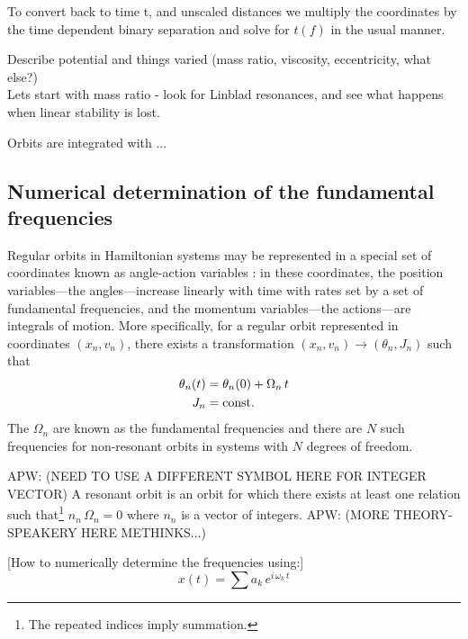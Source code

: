 \documentclass[usenatbib]{mn2e}
\newcommand{\apwtodo}[1]{{\color{red} APW: (\MakeUppercase{#1})}}
\begin{document}

To convert back to time t, and unscaled distances we multiply the
coordinates by the time dependent binary separation and solve for
$t(f)$ in the usual manner.



Describe potential and things varied (mass ratio, viscosity,
eccentricity, what else?)\\ Lets start with mass ratio - look for
Linblad resonances, and see what happens when linear stability is
lost.

Orbits are integrated with ...

\subsection{Numerical determination of the fundamental frequencies}\label{sec:freqs}

Regular orbits in Hamiltonian systems may be represented in a special set of coordinates known as angle-action variables \citep[e.g.,][]{goldstein80}: in these coordinates, the position variables---the angles---increase linearly with time with rates set by a set of fundamental frequencies, and the momentum variables---the actions---are integrals of motion. More specifically, for a regular orbit represented in coordinates $(x_n, v_n)$, there exists a transformation $(x_n, v_n)\rightarrow(\theta_n, J_n)$ such that
\begin{align}
	\theta_n(t) &= \theta_n(0) + \Omega_n\,t\\
	J_n &= {\rm const.}
\end{align}
The $\Omega_n$ are known as the fundamental frequencies and there are $N$ such frequencies for non-resonant orbits in systems with $N$ degrees of freedom.

\apwtodo{Need to use a different symbol here for integer vector}
A resonant orbit is an orbit for which there exists at least one relation such that\footnote{The repeated indices imply summation.} $n_n\,\Omega_n = 0$ where $n_n$ is a vector of integers. \apwtodo{More theory-speakery here methinks...}

[How to numerically determine the frequencies using:]
\begin{equation}
	x(t) = \sum a_k\,e^{i \, \omega_k \, t}
\end{equation}
\end{document}

